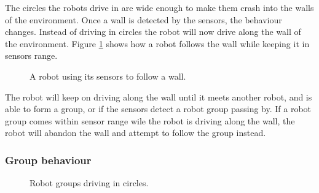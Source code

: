 The circles the robots drive in are wide enough to make them crash into the walls of the environment.
Once a wall is detected by the sensors, the behaviour changes.
Instead of driving in circles the robot will now drive along the wall of the environment.
Figure \ref{fig:individual-wall-drive} shows how a robot follows the wall while keeping it in sensors range.

\begin{figure}[H]	
	\centering
	\caption{A robot using its sensors to follow a wall.}
	\label{fig:individual-wall-drive}
\end{figure}


The robot will keep on driving along the wall until it meets another robot, and is able to form a group, or if the sensors detect a robot group passing by.
If a robot group comes within sensor range wile the robot is driving along the wall, the robot will abandon the wall and attempt to follow the group instead.

\subsubsection{Group behaviour}


\begin{figure}[H]
	
	\centering
	\caption{Robot groups driving in circles.}
	\label{fig:group-circles}
\end{figure}

